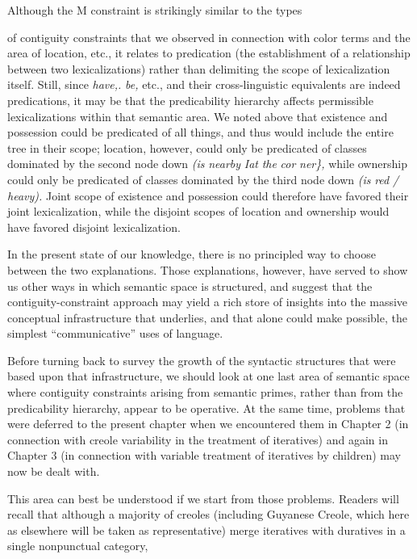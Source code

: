 Although the M constraint is strikingly similar to the types

of contiguity constraints that we observed in connection with color terms and the area of location, etc., it relates to predication (the
establishment of a relationship between two lexicalizations) rather than delimiting the scope of lexicalization itself. Still, since \textit{have,.} \textit{be,} etc., and their cross-linguistic equivalents are indeed predications, it may be that the predicability hierarchy affects permissible lexicalizations within that semantic area. We noted above that existence and posses\-sion could be predicated of all things, and thus would include the entire tree in their scope; location, however, could only be predicated of classes dominated by the second node down \textit{(is} \textit{nearby} \textit{I}\textit{at} \textit{the} \textit{cor\-} \textit{ner\},} while ownership could only be predicated of classes dominated by the third node down \textit{(is} \textit{red} \textit{/} \textit{heavy).} Joint scope of existence and possession could therefore have favored their joint lexicalization, while the disjoint scopes of location and ownership would have favored disjoint lexicalization.

In the present state of our knowledge, there is no principled way
to choose between the two explanations. Those explanations, however, have served to show us other ways in which semantic space is struc\-tured, and suggest that the contiguity-constraint approach may yield a rich store of insights into the massive conceptual infrastructure that underlies, and that alone could make possible, the simplest ``communi\-cative'' uses of language.

Before turning back to survey the growth of the syntactic struc\-tures that were based upon that infrastructure, we should look at one last area of semantic space where contiguity constraints arising from semantic primes, rather than from the predicability hierarchy, appear to be operative. At the same time, problems that were deferred to the present chapter when we encountered them in Chapter 2 (in connection with creole variability in the treatment of iteratives) and again in Chapter 3 (in connection with variable treatment of iteratives by children) may now be dealt with.

This area can best be understood if we start from those problems. Readers will recall that although a majority of creoles (including Guyanese Creole, which here as elsewhere will be taken as representa\-tive) merge iteratives with duratives in a single nonpunctual category,

